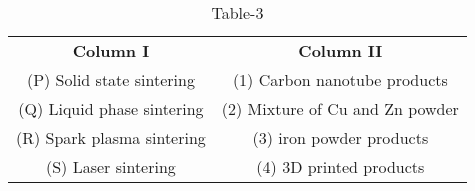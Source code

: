 \begin{table}[htbp]
  \centering
  \caption{Table-3}
  \label{table3}
  \begin{tabular}{cc}

\textbf{Column I} & \textbf{Column II}\\
     (P) Solid state sintering & (1) Carbon nanotube products\\
     (Q) Liquid phase sintering & (2) Mixture of Cu and Zn powder\\
     (R) Spark plasma sintering & (3) iron powder products\\
     (S) Laser sintering & (4) 3D printed products

  \end{tabular}
\end{table}